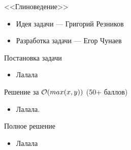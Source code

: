 \begin{frame}
  \begin{center}
    \LARGE <<Глиноведение>>
  \end{center}

  \begin{itemize}
  \item Идея задачи --- Григорий Резников
  \item Разработка задачи --- Егор Чунаев
  \end{itemize}

\end{frame}

\begin{frame}{Постановка задачи}

  \begin{itemize}
  \item Лалала
  \end{itemize}

\end{frame}

\begin{frame}{Решение за $\mathcal{O}(max(x, y))$ (50+ баллов)}
  \begin{itemize}
  \item Лалала.
  \end{itemize}
\end{frame}

\begin{frame}{Полное решение}
  \begin{itemize}
  \item Лалала
  \end{itemize}
\end{frame}
